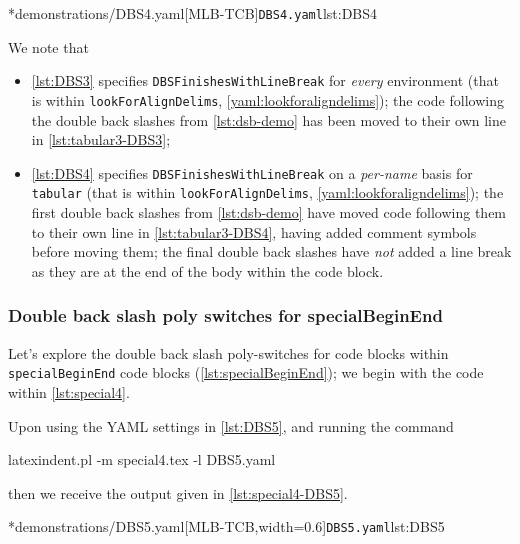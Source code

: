         \begin{cmhtcbraster}[raster column skip=.01\linewidth]
		\cmhlistingsfromfile*[style=yaml-LST]*{demonstrations/DBS4.yaml}[MLB-TCB]{\texttt{DBS4.yaml}}{lst:DBS4}
        \end{cmhtcbraster}

    We note that
    \begin{itemize}
      \item \cref{lst:DBS3} specifies \texttt{DBSFinishesWithLineBreak} for \emph{every} environment (that is within \texttt{lookForAlignDelims}, \vref{yaml:lookforaligndelims});
        the code following the double back slashes from \cref{lst:dsb-demo} has been moved to their own line in \cref{lst:tabular3-DBS3};
      \item \cref{lst:DBS4} specifies \texttt{DBSFinishesWithLineBreak} on a \emph{per-name} basis for \texttt{tabular} (that is within \texttt{lookForAlignDelims}, \vref{yaml:lookforaligndelims});
        the first double back slashes from \cref{lst:dsb-demo} have moved code following them to their own line in \cref{lst:tabular3-DBS4}, having added comment
        symbols before moving them; the final double back slashes have \emph{not} added a line break as they are at the end of the body
        within the code block.
    \end{itemize}

      \subsubsection{Double back slash poly switches for specialBeginEnd}
      Let's explore the double back slash poly-switches for code blocks within \texttt{specialBeginEnd} code blocks (\vref{lst:specialBeginEnd});
      we begin with the code within \cref{lst:special4}.


        Upon using the YAML settings in \cref{lst:DBS5}, and running the command
	\begin{commandshell}
latexindent.pl -m special4.tex -l DBS5.yaml
            \end{commandshell}
            then we receive the output given in \cref{lst:special4-DBS5}.

        \begin{cmhtcbraster}[
            raster force size=false,
            raster column 1/.style={add to width=-.1\textwidth},
                             raster column skip=.06\linewidth]
		\cmhlistingsfromfile*[style=yaml-LST]*{demonstrations/DBS5.yaml}[MLB-TCB,width=0.6\textwidth]{\texttt{DBS5.yaml}}{lst:DBS5}
        \end{cmhtcbraster}

